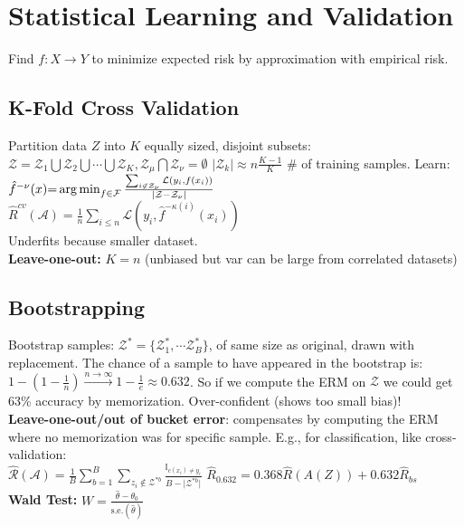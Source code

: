 \section*{Statistical Learning and Validation}

Find $f: X \to Y$ to minimize expected risk by approximation with empirical risk.

\subsection*{K-Fold Cross Validation}
Partition data $Z$ into $K$ equally sized, disjoint subsets:\\
$\mathcal{Z}=\mathcal{Z}_1\bigcup\mathcal{Z}_2\bigcup\cdots\bigcup\mathcal{Z}_K, \mathcal{Z}_\mu \bigcap\mathcal{Z}_\nu = \emptyset $
$|\mathcal{Z}_k|\approx n\frac{K-1}{K}$ \# of training samples. Learn:
$\hat{f}^{-\nu}(x){=} \operatorname*{arg\,min}_{f\in\mathcal{F}}\frac{\sum_{i\not\in\mathcal{Z}_\nu}\mathcal{L}(y_i,f(x_i))}{|\mathcal{Z}-\mathcal{Z}_{\nu}|}$\\
$\hat{R}^{cv}(\mathcal{A}) = \frac{1}{n}\sum_{i\leq n}\mathcal{L}(y_i,\hat{f}^{-\kappa(i)}(x_i))$\\
Underfits because smaller dataset.\\
\textbf{Leave-one-out:} $K=n$ (unbiased but var can be large from correlated datasets)

\subsection*{Bootstrapping}
Bootstrap samples: $\mathcal{Z}^*=\{\mathcal{Z}_1^*, \cdots\mathcal{Z}_B^*\}$, of same size as original, drawn with replacement.
The chance of a sample to have appeared in the bootstrap is:\\
$1-(1-\frac{1}{n})\stackrel{n\to\infty}{\to} 1-\frac{1}{e}\approx 0.632$. So if we compute the ERM on $\mathcal{Z}$ we could get 63\% accuracy by memorization. Over-confident (shows too small bias)!\\
\textbf{Leave-one-out/out of bucket error}: compensates by computing the ERM where no memorization was for specific sample. E.g., for classification, like cross-validation:\\
$\hat{\mathcal{R}}(\mathcal{A})=\frac{1}{B}\sum_{b=1}^B\sum_{z_i\not\in\mathcal{Z}^{*b}}\frac{\mathbb{I}_{c(x_i)\neq y_i}}{B-\lvert\mathcal{Z}^{*b}\rvert}$
$\hat{R}_{0.632} = 0.368 \hat{R}(A(Z)) + 0.632 \hat{R}_{bs}$ \\
\textbf{Wald Test: }$W = \frac{\hat{\theta} - \theta_0}{\text{s.e.}(\hat{\theta})}$

